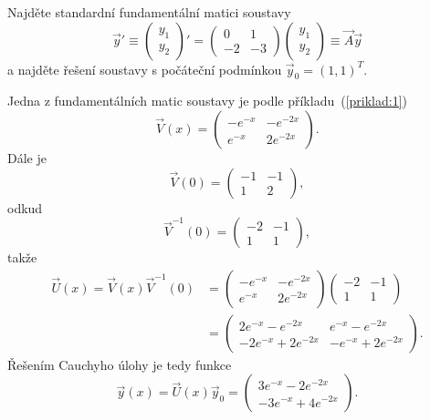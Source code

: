 \begin{ex}\label{priklad:2}
   Najděte standardní fundamentální matici soustavy
   \[
      \vec{y}'\equiv
      \begin{pmatrix}
         y_1\\y_2
      \end{pmatrix}'
      =
      \begin{pmatrix}
         0 & 1 \\ -2 & -3
      \end{pmatrix}
      \begin{pmatrix}
         y_1\\y_2
      \end{pmatrix}
      \equiv \vec{A}\vec{y}
   \]
   a najděte řešení soustavy s počáteční podmínkou $\vec{y}_0 = (1,1)^T$.
\end{ex}
\begin{sol}
   Jedna z fundamentálních matic soustavy je podle příkladu~(\ref{priklad:1})
   \[
      \vec{V}(x) = \begin{pmatrix}
         -e^{-x} &  -e^{-2x}\\
          e^{-x} &  2e^{-2x}
      \end{pmatrix}.
   \]
   Dále je
   \[
      \vec{V}(0) = \begin{pmatrix}
         -1 & -1\\
          1 &  2
      \end{pmatrix},
   \]
   odkud
   \[
      \vec{V}^{-1}(0) = \begin{pmatrix}
         -2 & -1\\
          1 &  1
      \end{pmatrix},
   \]
   takže
   \[
      \begin{split}
      \vec{U}(x) = \vec{V}(x)\vec{V}^{-1}(0) &= 
      \begin{pmatrix}
         -e^{-x} &  -e^{-2x}\\
          e^{-x} &  2e^{-2x}
      \end{pmatrix}
      \begin{pmatrix}
         -2 & -1\\
          1 &  1
      \end{pmatrix}\\
      &=
      \begin{pmatrix}
         2e^{-x}-e^{-2x} & e^{-x}-e^{-2x}\\
         -2e^{-x}+2e^{-2x} & -e^{-x}+2e^{-2x}
      \end{pmatrix}.
      \end{split}
   \]
   Řešením Cauchyho úlohy je tedy funkce
   \[
      \vec{y}(x) = \vec{U}(x)\vec{y}_0
      =
      \begin{pmatrix}
         3e^{-x}-2e^{-2x}\\
         -3e^{-x}+4e^{-2x}
      \end{pmatrix}.
   \]
\end{sol}

